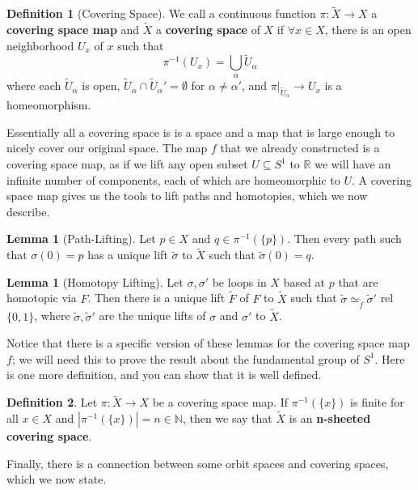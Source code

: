 \documentclass[11pt, oneside]{amsart}   	%
\theoremstyle{definition}
\newtheorem{definition}{Definition}[section]
\newtheorem{lemma}[theorem]{Lemma}
\begin{document}
	\begin{definition}[Covering Space]
		We call a continuous function $\pi : \tilde X\rightarrow X$ a \textbf{covering space map} and $\tilde X$ a \textbf{covering space} of $X$ if $\forall x\in X$, 
		there is an open neighborhood $U_x$ of $x$ such that 
		$$
			\pi^{-1}(U_x) = \bigcup_\alpha\tilde U_\alpha
		$$
		where each $\tilde U_\alpha$ is open, $\tilde U_\alpha\cap \tilde U_\alpha' = \emptyset$ for $\alpha\neq \alpha'$, and $\pi|_{\tilde U_\alpha}\rightarrow 
		U_x$ is a homeomorphism.
	\end{definition}
	
	Essentially all a covering space is is a space and a map that is large enough to nicely cover our original space. The map $f$ that we already constructed is a 
	covering space map, as if we lift any open subset $U\subseteq S^1$ to $\mathbb R$ we will have an infinite number of components, each of which are 
	homeomorphic to $U$. A covering space map gives us the tools to lift paths and homotopies, which we now describe.
	
	\begin{lemma}[Path-Lifting]
		Let $p\in X$ and $q\in\pi^{-1}(\{p\})$. Then every path such that $\sigma(0) = p$ has a unique lift $\tilde\sigma$ to $\tilde X$ such that $\tilde\sigma(0) = 
		q$. 
	\end{lemma}
	
	\begin{lemma}[Homotopy Lifting]
		Let $\sigma, \sigma'$ be loops in $X$ based at $p$ that are homotopic via $F$. Then there is a unique lift $\tilde F$ of $F$ to $\tilde X$ such that 
		$\tilde\sigma\simeq_{\tilde f}\tilde\sigma'$ rel $\{0, 1\}$, where $\tilde\sigma, \tilde\sigma'$ are the unique lifts of $\sigma$ and $\sigma'$ to $\tilde X$. 
	\end{lemma}
	
	Notice that there is a specific version of these lemmas for the covering space map $f$; we will need this to prove the result about the fundamental group of 
	$S^1$. Here is one more definition, and you can show that it is well defined.
	
	\begin{definition}
		Let $\pi : \tilde X\rightarrow X$ be a covering space map. If $\pi^{-1}(\{x\})$ is finite for all $x\in X$ and $|\pi^{-1}(\{x\})| = n\in\mathbb N$, then we say 
		that $\tilde X$ is an \textbf{n-sheeted covering space}.
	\end{definition}
	
	Finally, there is a connection between some orbit spaces and covering spaces, which we now state.
	
\end{document}
